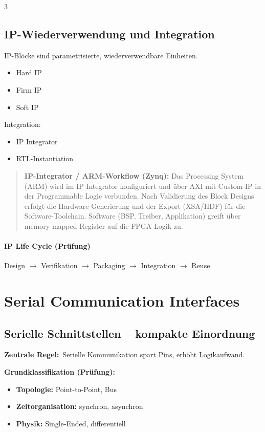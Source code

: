 \documentclass[10pt,a4paper]{article}
\newcommand{\pcentral}[1]{\textbf{\textcolor{examMagenta}{Zentrale Regel:}}~#1}
\begin{document}
\begin{multicols}{3}
\subsection{IP-Wiederverwendung und Integration}
IP-Blöcke sind parametrisierte, wiederverwendbare Einheiten.

\begin{itemize}
  \item Hard IP
  \item Firm IP
  \item Soft IP
\end{itemize}

Integration:
\begin{itemize}
  \item IP Integrator
  \item RTL-Instantiation
\end{itemize}

\begin{quote}\small
\textbf{IP-Integrator / ARM-Workflow (Zynq):}
Das Processing System (ARM) wird im IP Integrator
konfiguriert und über AXI mit Custom-IP in der
Programmable Logic verbunden.
Nach Validierung des Block Designs erfolgt die
Hardware-Generierung und der Export (XSA/HDF)
für die Software-Toolchain.
Software (BSP, Treiber, Applikation) greift über
memory-mapped Register auf die FPGA-Logik zu.
\end{quote}
\paragraph{IP Life Cycle (Prüfung)}
Design $\rightarrow$ Verifikation $\rightarrow$ Packaging $\rightarrow$ Integration $\rightarrow$ Reuse


\section{Serial Communication Interfaces}

\subsection{Serielle Schnittstellen -- kompakte Einordnung}

\pcentral{Serielle Kommunikation spart Pins, erhöht Logikaufwand.}

\textbf{Grundklassifikation (Prüfung):}
\begin{itemize}
  \item \textbf{Topologie:} Point-to-Point, Bus
  \item \textbf{Zeitorganisation:} synchron, asynchron
  \item \textbf{Physik:} Single-Ended, differentiell
\end{itemize}


\end{multicols}
\end{document}
